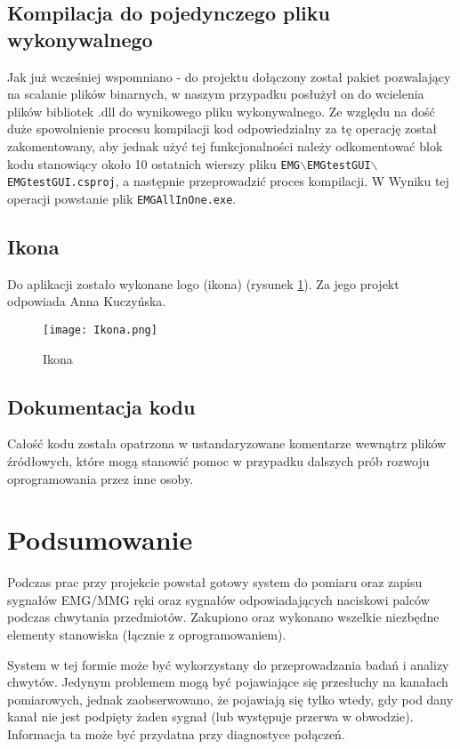 \documentclass[10pt, a4paper]{article}
\begin{document}
\subsection{Kompilacja do pojedynczego pliku wykonywalnego}
Jak już wcześniej wspomniano - do projektu dołączony został pakiet pozwalający na scalanie plików binarnych, w naszym przypadku posłużył on do wcielenia plików bibliotek .dll do wynikowego pliku wykonywalnego. Ze względu na dość duże spowolnienie procesu kompilacji kod odpowiedzialny za tę operację został zakomentowany, aby jednak użyć tej funkcjonalności należy odkomentować blok kodu stanowiący około 10 ostatnich wierszy pliku \texttt{EMG$\backslash$EMGtestGUI$\backslash$EMGtestGUI.csproj}, a następnie przeprowadzić proces kompilacji. W Wyniku tej operacji powstanie plik \texttt{EMGAllInOne.exe}.

\newpage

\subsection{Ikona}

Do aplikacji zostało wykonane logo (ikona) (rysunek \ref{ikona}). Za jego projekt odpowiada Anna Kuczyńska.

\begin{figure}[H]
\begin{center}
\texttt{[image: Ikona.png]}
\caption{Ikona}
\label{ikona}
\end{center}
\end{figure}

\subsection{Dokumentacja kodu}
Całość kodu została opatrzona w ustandaryzowane komentarze wewnątrz plików źródłowych, które mogą stanowić pomoc w przypadku dalszych prób rozwoju oprogramowania przez inne osoby.


\section{Podsumowanie}
\label{sec:podsumowanie}

Podczas prac przy projekcie powstał gotowy system do pomiaru oraz zapisu sygnałów EMG/MMG ręki oraz sygnałów odpowiadających naciskowi palców podczas chwytania przedmiotów. Zakupiono oraz wykonano wszelkie niezbędne elementy stanowiska (łącznie z oprogramowaniem).

System w tej formie może być wykorzystany do przeprowadzania badań i analizy chwytów. Jedynym problemem mogą być pojawiające się przesłuchy na kanałach pomiarowych, jednak zaobserwowano, że pojawiają się tylko wtedy, gdy pod dany kanał nie jest podpięty żaden sygnał (lub występuje przerwa w obwodzie). Informacja ta może być przydatna przy diagnostyce połączeń.
\end{document}
